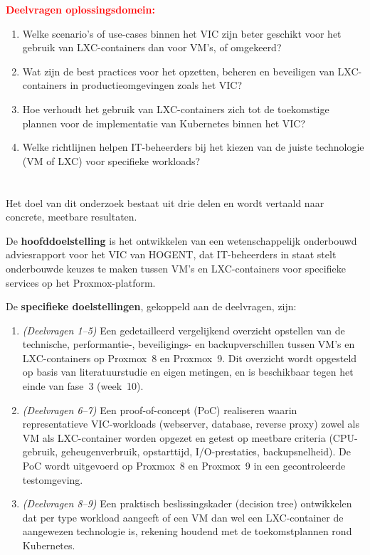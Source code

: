 \textcolor{red}{\textbf{Deelvragen oplossingsdomein:}}

\begin{enumerate}[resume]
    \item Welke scenario's of use-cases binnen het VIC zijn beter geschikt voor het gebruik van LXC-containers dan voor VM's, of omgekeerd?
    \item Wat zijn de best practices voor het opzetten, beheren en beveiligen van LXC-containers in productieomgevingen zoals het VIC?
    \item Hoe verhoudt het gebruik van LXC-containers zich tot de toekomstige plannen voor de implementatie van Kubernetes binnen het VIC?
    \item Welke richtlijnen helpen IT-beheerders bij het kiezen van de juiste technologie (VM of LXC) voor specifieke workloads?
\end{enumerate}

\section{}%
\label{sec:onderzoeksdoelstelling}

Het doel van dit onderzoek bestaat uit drie delen en wordt vertaald naar concrete, meetbare resultaten.

De \textbf{hoofddoelstelling} is het ontwikkelen van een wetenschappelijk onderbouwd adviesrapport voor het VIC van HOGENT, dat IT-beheerders in staat stelt onderbouwde keuzes te maken tussen VM's en LXC-containers voor specifieke services op het Proxmox-platform.

De \textbf{specifieke doelstellingen}, gekoppeld aan de deelvragen, zijn:

\begin{enumerate}
    \item \textit{(Deelvragen 1--5)} Een gedetailleerd vergelijkend overzicht opstellen van de technische, performantie-, beveiligings- en backupverschillen tussen VM's en LXC-containers op Proxmox~8 en Proxmox~9. Dit overzicht wordt opgesteld op basis van literatuurstudie en eigen metingen, en is beschikbaar tegen het einde van fase~3 (week~10).
    \item \textit{(Deelvragen 6--7)} Een proof-of-concept (PoC) realiseren waarin representatieve VIC-workloads (webserver, database, reverse proxy) zowel als VM als LXC-container worden opgezet en getest op meetbare criteria (CPU-gebruik, geheugenverbruik, opstarttijd, I/O-prestaties, backupsnelheid). De PoC wordt uitgevoerd op Proxmox~8 en Proxmox~9 in een gecontroleerde testomgeving.
    \item \textit{(Deelvragen 8--9)} Een praktisch beslissingskader (decision tree) ontwikkelen dat per type workload aangeeft of een VM dan wel een LXC-container de aangewezen technologie is, rekening houdend met de toekomstplannen rond Kubernetes.
\end{enumerate}

